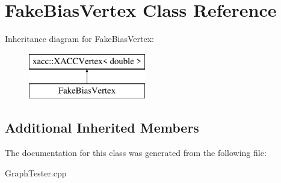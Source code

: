 \hypertarget{a01216}{}\section{Fake\+Bias\+Vertex Class Reference}
\label{a01216}
Inheritance diagram for Fake\+Bias\+Vertex\+:\begin{figure}[H]
\begin{center}
\leavevmode
\includegraphics[height=2.000000cm]{a01216}
\end{center}
\end{figure}
\subsection*{Additional Inherited Members}


The documentation for this class was generated from the following file\+:\begin{DoxyCompactItemize}
\item 
Graph\+Tester.\+cpp\end{DoxyCompactItemize}
